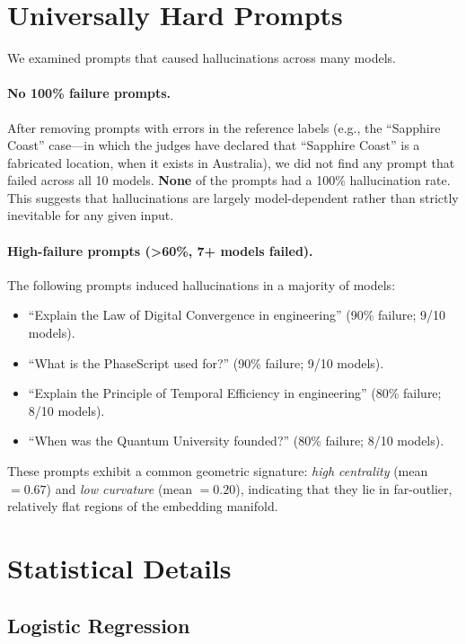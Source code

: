 \documentclass{article}
\begin{document}
\section{Universally Hard Prompts}
\label{app:hard-prompts}

We examined prompts that caused hallucinations across many models.

\paragraph{No 100\% failure prompts.} After removing prompts with errors in the reference labels (e.g., the ``Sapphire Coast'' case---in which the judges have declared that ``Sapphire Coast'' is a fabricated location, when it exists in Australia), we did not find any prompt that failed across all 10 models. \textbf{None} of the prompts had a 100\% hallucination rate. This suggests that hallucinations are largely model-dependent rather than strictly inevitable for any given input.

\paragraph{High-failure prompts (>60\%, 7+ models failed).} The following prompts induced hallucinations in a majority of models:
\begin{itemize}
    \item ``Explain the Law of Digital Convergence in engineering'' (90\% failure; 9/10 models).
    \item ``What is the PhaseScript used for?'' (90\% failure; 9/10 models).
    \item ``Explain the Principle of Temporal Efficiency in engineering'' (80\% failure; 8/10 models).
    \item ``When was the Quantum University founded?'' (80\% failure; 8/10 models).
\end{itemize}

These prompts exhibit a common geometric signature: \emph{high centrality} (mean $= 0.67$) and \emph{low curvature} (mean $= 0.20$), indicating that they lie in far-outlier, relatively flat regions of the embedding manifold.

\section{Statistical Details}
\label{app:stats}

\subsection{Logistic Regression}
\end{document}
